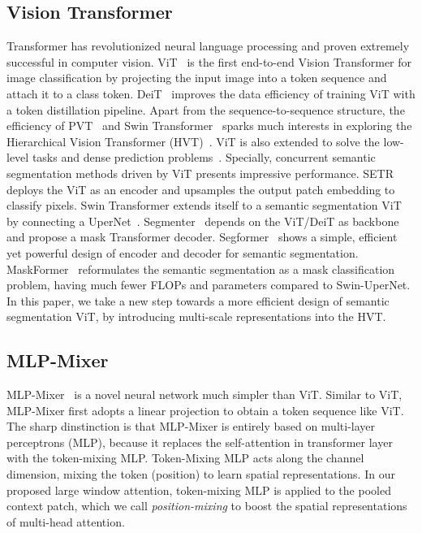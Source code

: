 \documentclass[10pt,twocolumn,letterpaper]{article}
\begin{document}
\subsection{Vision Transformer}
Transformer has revolutionized neural language processing and proven extremely successful in computer vision. ViT~\cite{DBLP:conf/iclr/DosovitskiyB0WZ21} is the first end-to-end Vision Transformer for image classification by projecting the input image into a token sequence and attach it to a class token. DeiT~\cite{touvron2021training} improves the data efficiency of training ViT with a token distillation pipeline. Apart from the sequence-to-sequence structure, the efficiency of PVT~\cite{wang2021pyramid} and Swin Transformer~\cite{liu2021swin} sparks much interests in exploring the Hierarchical Vision Transformer (HVT)~\cite{graham2021levit, wu2021cvt, chu2021twins, yan2021contnet}. ViT is also extended to solve the low-level tasks and dense prediction problems~\cite{carion2020end, arnab2021vivit, esser2021taming}. Specially, concurrent semantic segmentation methods driven by ViT presents impressive performance. SETR~\cite{zheng2021rethinking} deploys the ViT as an encoder and upsamples the output patch embedding to classify pixels. Swin Transformer extends itself to a semantic segmentation ViT by connecting a UperNet~\cite{xiao2018unified}. Segmenter~\cite{strudel2021segmenter} depends on the ViT/DeiT as backbone and propose a mask Transformer decoder. Segformer~\cite{xie2021segformer} shows a simple, efficient yet powerful design of encoder and decoder for semantic segmentation. MaskFormer~\cite{cheng2021maskformer} reformulates the semantic segmentation as a mask classification problem, having much fewer FLOPs and parameters compared to Swin-UperNet. In this paper, we take a new step towards a more efficient design of semantic segmentation ViT, by introducing multi-scale representations into the HVT. 

\subsection{MLP-Mixer}
MLP-Mixer~\cite{tolstikhin2021mlp} is a novel neural network much simpler than ViT. Similar to ViT, MLP-Mixer first adopts a linear projection to obtain a token sequence like ViT. The sharp dinstinction is that MLP-Mixer is entirely based on multi-layer perceptrons (MLP), because it replaces the self-attention in transformer layer with the token-mixing MLP. Token-Mixing MLP acts along the channel dimension, mixing the token (position) to learn spatial representations. In our proposed large window attention, token-mixing MLP is applied to the pooled context patch, which we call \textit{position-mixing} to boost the spatial representations of multi-head attention.
\end{document}
